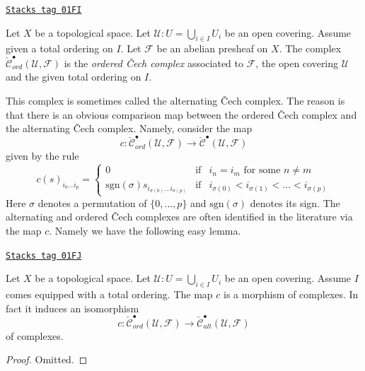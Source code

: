 \begin{definition}
\label{cohomology-definition-ordered-cech-complex}
\href{https://stacks.math.columbia.edu/tag/01FI}{\texttt{Stacks tag 01FI}}

Let $X$ be a topological space.
Let $\mathcal{U} : U = \bigcup_{i \in I} U_i$ be an open covering.
Assume given a total ordering on $I$.
Let $\mathcal{F}$ be an abelian presheaf on $X$.
The complex $\check{\mathcal{C}}_{ord}^\bullet(\mathcal{U}, \mathcal{F})$
is the {\it ordered {\v C}ech complex} associated to $\mathcal{F}$, the
open covering $\mathcal{U}$ and the given total ordering on $I$.
\end{definition}

This complex is sometimes called the alternating {\v C}ech complex.
The reason is that there is an obvious comparison map between
the ordered {\v C}ech complex and the alternating {\v C}ech complex.
Namely, consider the map
$$
c :
\check{\mathcal{C}}_{ord}^\bullet(\mathcal{U}, \mathcal{F})
\longrightarrow
\check{\mathcal{C}}^\bullet(\mathcal{U}, \mathcal{F})
$$
given by the rule
$$
c(s)_{i_0\ldots i_p} =
\left\{
\begin{matrix}
0 &
\text{if} &
i_n = i_m \text{ for some } n \not = m\\
\text{sgn}(\sigma) s_{i_{\sigma(0)}\ldots i_{\sigma(p)}} &
\text{if} &
i_{\sigma(0)} < i_{\sigma(1)} < \ldots < i_{\sigma(p)}
\end{matrix}
\right.
$$
Here $\sigma$ denotes a permutation of $\{0, \ldots, p\}$ and
$\text{sgn}(\sigma)$ denotes its sign. The alternating and ordered
{\v C}ech complexes are often identified in the literature via the map
$c$. Namely we have the following easy lemma.

\begin{lemma}
\label{cohomology-lemma-ordered-alternating}
\href{https://stacks.math.columbia.edu/tag/01FJ}{\texttt{Stacks tag 01FJ}}

Let $X$ be a topological space.
Let $\mathcal{U} : U = \bigcup_{i \in I} U_i$ be an open covering.
Assume $I$ comes equipped with a total ordering.
The map $c$ is a morphism of complexes. In fact it induces
an isomorphism
$$
c : \check{\mathcal{C}}_{ord}^\bullet(\mathcal{U}, \mathcal{F})
\to \check{\mathcal{C}}_{alt}^\bullet(\mathcal{U}, \mathcal{F})
$$
of complexes.
\end{lemma}

\begin{proof}
Omitted.
\end{proof}

